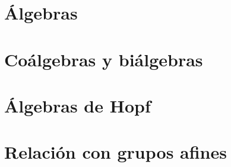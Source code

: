 \section{\'{A}lgebras}\label{sec:kalgebras}


\section{Co\'{a}lgebras y bi\'{a}lgebras}\label{sec:coalgebras}


\section{\'{A}lgebras de Hopf}\label{sec:hopf}


\section{Relaci\'{o}n con grupos afines}\label{sec:gruposafines}


\printbibliography[heading=bibintoc,title=\refname]
